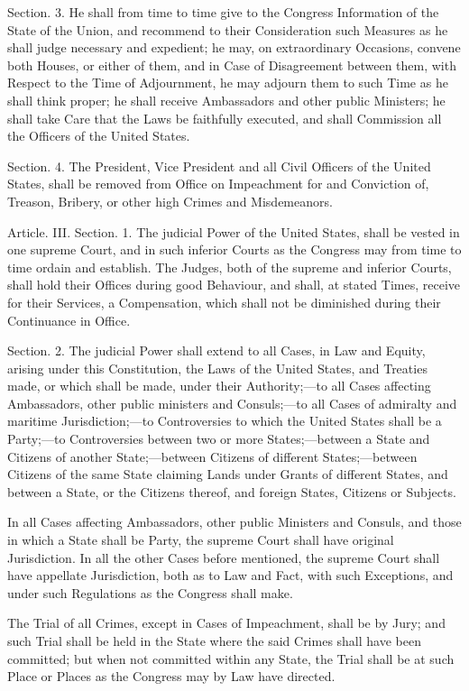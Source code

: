 \documentclass{article}
\begin{document}
Section. 3.  He shall from time to time give to the Congress Information of the
State of the Union, and recommend to their Consideration such Measures as he
shall judge necessary and expedient; he may, on extraordinary Occasions, convene
both Houses, or either of them, and in Case of Disagreement between them, with
Respect to the Time of Adjournment, he may adjourn them to such Time as he shall
think proper; he shall receive Ambassadors and other public Ministers; he shall
take Care that the Laws be faithfully executed, and shall Commission all the
Officers of the United States.


Section. 4.  The President, Vice President and all Civil Officers of the United
States, shall be removed from Office on Impeachment for and Conviction of,
Treason, Bribery, or other high Crimes and Misdemeanors.


Article. III.  Section. 1.  The judicial Power of the United States, shall be
vested in one supreme Court, and in such inferior Courts as the Congress may
from time to time ordain and establish. The Judges, both of the supreme and
inferior Courts, shall hold their Offices during good Behaviour, and shall, at
stated Times, receive for their Services, a Compensation, which shall not be
diminished during their Continuance in Office.


Section. 2.  The judicial Power shall extend to all Cases, in Law and Equity,
arising under this Constitution, the Laws of the United States, and Treaties
made, or which shall be made, under their Authority;—to all Cases affecting
Ambassadors, other public ministers and Consuls;—to all Cases of admiralty and
maritime Jurisdiction;—to Controversies to which the United States shall be a
Party;—to Controversies between two or more States;—between a State and Citizens
of another State;—between Citizens of different States;—between Citizens of the
same State claiming Lands under Grants of different States, and between a State,
or the Citizens thereof, and foreign States, Citizens or Subjects.

In all Cases affecting Ambassadors, other public Ministers and Consuls, and
those in which a State shall be Party, the supreme Court shall have original
Jurisdiction. In all the other Cases before mentioned, the supreme Court shall
have appellate Jurisdiction, both as to Law and Fact, with such Exceptions, and
under such Regulations as the Congress shall make.

The Trial of all Crimes, except in Cases of Impeachment, shall be by Jury; and
such Trial shall be held in the State where the said Crimes shall have been
committed; but when not committed within any State, the Trial shall be at such
Place or Places as the Congress may by Law have directed.
\end{document}
